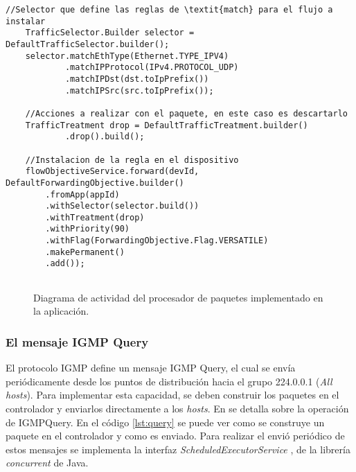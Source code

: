 \begin{lstlisting}[caption={Fragmento de código que envía un mensaje \textit{OpenFlow} para modificar las reglas en un dispositivo}, captionpos=b, label={lst:match}]
    //Selector que define las reglas de \textit{match} para el flujo a instalar
    TrafficSelector.Builder selector = DefaultTrafficSelector.builder();
    selector.matchEthType(Ethernet.TYPE_IPV4)
            .matchIPProtocol(IPv4.PROTOCOL_UDP)
            .matchIPDst(dst.toIpPrefix())
            .matchIPSrc(src.toIpPrefix());
    
    //Acciones a realizar con el paquete, en este caso es descartarlo 
    TrafficTreatment drop = DefaultTrafficTreatment.builder()
            .drop().build();
    
    //Instalacion de la regla en el dispositivo 
    flowObjectiveService.forward(devId, DefaultForwardingObjective.builder()
        .fromApp(appId)
        .withSelector(selector.build())
        .withTreatment(drop)
        .withPriority(90)
        .withFlag(ForwardingObjective.Flag.VERSATILE)
        .makePermanent()
        .add());
    
\end{lstlisting}


\begin{figure}[th]
	\centering 
	\caption[Diagrama de actividad del procesador de paquetes]{Diagrama de actividad del procesador de paquetes implementado en la aplicación.}
	\label{fig:pcktprocactiv}
\end{figure}

\subsubsection*{El mensaje IGMP Query}

El protocolo IGMP define un mensaje IGMP Query, el cual se envía periódicamente desde los puntos de distribución hacia el grupo 224.0.0.1 (\textit{All hosts}). Para implementar esta capacidad, se deben construir los paquetes en el controlador y enviarlos directamente a los \textit{hosts}. En \parencite{queryinfo} se detalla sobre la operación de IGMPQuery. En el código \ref{lst:query} se puede ver como se construye un paquete en el controlador y como es enviado. Para realizar el envió periódico de estos mensajes se implementa la interfaz \textit{ScheduledExecutorService} \parencite{execjava}, de la librería \textit{concurrent} de Java.

